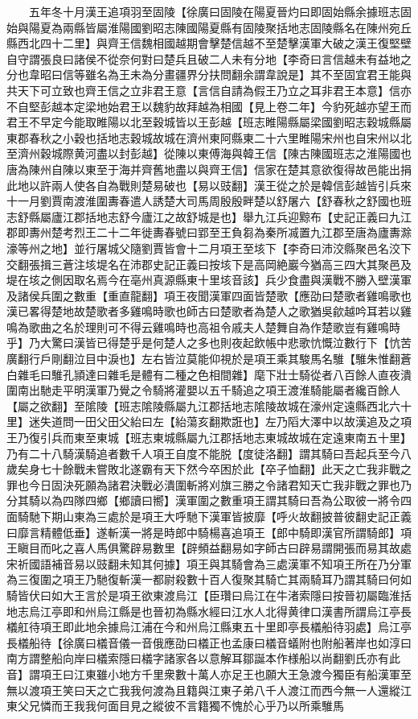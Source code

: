 　　五年冬十月漢王追項羽至固陵【徐廣曰固陵在陽夏晉灼曰即固始縣余據班志固始與陽夏為兩縣皆屬淮陽國劉昭志陳國陽夏縣有固陵聚括地志固陵縣名在陳州宛丘縣西北四十二里】與齊王信魏相國越期會擊楚信越不至楚擊漢軍大破之漢王復堅壁自守謂張良曰諸侯不從奈何對曰楚兵且破二人未有分地【李奇曰言信越未有益地之分也韋昭曰信等雖名為王未為分畫疆界分扶問翻余謂韋說是】其不至固宜君王能與共天下可立致也齊王信之立非君王意【言信自請為假王乃立之耳非君王本意】信亦不自堅彭越本定梁地始君王以魏豹故拜越為相國【見上卷二年】今豹死越亦望王而君王不早定今能取睢陽以北至穀城皆以王彭越【班志睢陽縣屬梁國劉昭志穀城縣屬東郡春秋之小穀也括地志穀城故城在濟州東阿縣東二十六里睢陽宋州也自宋州以北至濟州穀城際黄河盡以封彭越】從陳以東傅海與韓王信【陳古陳國班志之淮陽國也唐為陳州自陳以東至于海并齊舊地盡以與齊王信】信家在楚其意欲復得故邑能出捐此地以許兩人使各自為戰則楚易破也【易以豉翻】漢王從之於是韓信彭越皆引兵來十一月劉賈南渡淮圍夀春遣人誘楚大司馬周殷殷畔楚以舒屠六【舒春秋之舒國也班志舒縣屬廬江郡括地志舒今廬江之故舒城是也】舉九江兵迎黥布【史記正義曰九江郡即夀州楚考烈王二十二年徙夀春號曰郢至王負芻為秦所㓕置九江郡至唐為廬夀滁濠等州之地】並行屠城父隨劉賈皆會十二月項王至垓下【李奇曰沛洨縣聚邑名洨下交翻張揖三蒼注垓堤名在沛郡史記正義曰按垓下是高岡絶巖今猶高三四大其聚邑及堤在垓之側因取名焉今在亳州真源縣東十里垓音該】兵少食盡與漢戰不勝入壁漢軍及諸侯兵圍之數重【重直龍翻】項王夜聞漢軍四面皆楚歌【應劭曰楚歌者雞鳴歌也漢已畧得楚地故楚歌者多雞鳴時歌也師古曰楚歌者為楚人之歌猶吳歈越吟耳若以雞鳴為歌曲之名於理則可不得云雞鳴時也高祖令戚夫人楚舞自為作楚歌豈有雞鳴時乎】乃大驚曰漢皆已得楚乎是何楚人之多也則夜起飲帳中悲歌忼慨泣數行下【忼苦廣翻行戶剛翻泣目中淚也】左右皆泣莫能仰視於是項王乘其駿馬名騅【騅朱惟翻蒼白雜毛曰騅孔頴達曰雜毛是體有二種之色相間雜】麾下壯士騎從者八百餘人直夜潰圍南出馳走平明漢軍乃覺之令騎將灌嬰以五千騎追之項王渡淮騎能屬者纔百餘人【屬之欲翻】至隂陵【班志隂陵縣屬九江郡括地志隂陵故城在濠州定遠縣西北六十里】迷失道問一田父田父紿曰左【紿蕩亥翻欺誑也】左乃䧟大澤中以故漢追及之項王乃復引兵而東至東城【班志東城縣屬九江郡括地志東城故城在定遠東南五十里】乃有二十八騎漢騎追者數千人項王自度不能脱【度徒洛翻】謂其騎曰吾起兵至今八歲矣身七十餘戰未嘗敗北遂霸有天下然今卒困於此【卒子恤翻】此天之亡我非戰之罪也今日固決死願為諸君決戰必潰圍斬將刈旗三勝之令諸君知天亡我非戰之罪也乃分其騎以為四隊四鄉【鄉讀曰嚮】漢軍圍之數重項王謂其騎曰吾為公取彼一將令四面騎馳下期山東為三處於是項王大呼馳下漢軍皆披靡【呼火故翻披普彼翻史記正義曰靡言精體低垂】遂斬漢一將是時郎中騎楊喜追項王【郎中騎即漢官所謂騎郎】項王瞋目而叱之喜人馬俱驚辟易數里【辟頻益翻易如字師古曰辟易謂開張而易其故處宋祈國語補音易以豉翻未知其何據】項王與其騎會為三處漢軍不知項王所在乃分軍為三復圍之項王乃馳復斬漢一都尉殺數十百人復聚其騎亡其兩騎耳乃謂其騎曰何如騎皆伏曰如大王言於是項王欲東渡烏江【臣瓚曰烏江在牛渚索隱曰按晉初屬臨淮括地志烏江亭即和州烏江縣是也晉初為縣水經曰江水人北得黄律口漢書所謂烏江亭長檥舡待項王即此地余據烏江浦在今和州烏江縣東五十里即亭長檥船待羽處】烏江亭長檥船待【徐廣曰檥音儀一音俄應劭曰檥正也孟康曰檥音蟻附也附船著岸也如淳曰南方謂整船向岸曰檥索隱曰檥字諸家各以意解耳鄒誕本作様船以尚翻劉氏亦有此音】謂項王曰江東雖小地方千里衆數十萬人亦足王也願大王急渡今獨臣有船漢軍至無以渡項王笑曰天之亡我我何渡為且籍與江東子弟八千人渡江而西今無一人還縱江東父兄憐而王我我何面目見之縱彼不言籍獨不愧於心乎乃以所乘騅馬
